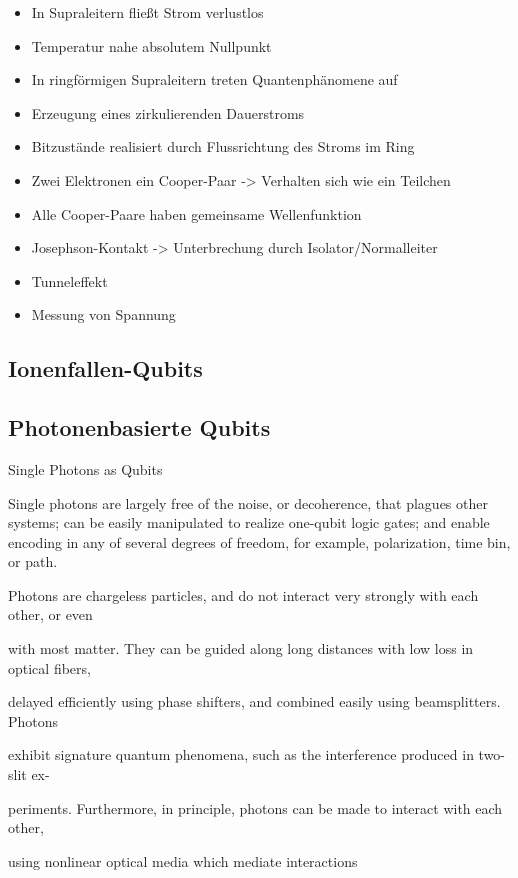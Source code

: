 \begin{itemize}
\item In Supraleitern fließt Strom verlustlos
\item Temperatur nahe absolutem Nullpunkt
\item In ringförmigen Supraleitern treten Quantenphänomene auf
\item Erzeugung eines zirkulierenden Dauerstroms
\item Bitzustände realisiert durch Flussrichtung des Stroms im Ring
\item Zwei Elektronen ein Cooper-Paar -> Verhalten sich wie ein Teilchen
\item Alle Cooper-Paare haben gemeinsame Wellenfunktion
\item Josephson-Kontakt -> Unterbrechung durch Isolator/Normalleiter
\item Tunneleffekt
\item Messung von Spannung
\end{itemize}

\subsection{Ionenfallen-Qubits }
\subsection{Photonenbasierte Qubits}

Single Photons as Qubits 

Single photons are largely free of the noise, or decoherence, that plagues other systems; can be easily manipulated to realize one-qubit logic gates; and enable encoding in any of several degrees of freedom, for example, polarization, time bin, or path. 
\cite{obrien_optical_2007}



Photons are chargeless particles, and do not interact very strongly with each other, or even 

with most matter. They can be guided along long distances with low loss in optical fibers, 

delayed efficiently using phase shifters, and combined easily using beamsplitters. Photons 

exhibit signature quantum phenomena, such as the interference produced in two-slit ex- 

periments. Furthermore, in principle, photons can be made to interact with each other, 

using nonlinear optical media which mediate interactions 


